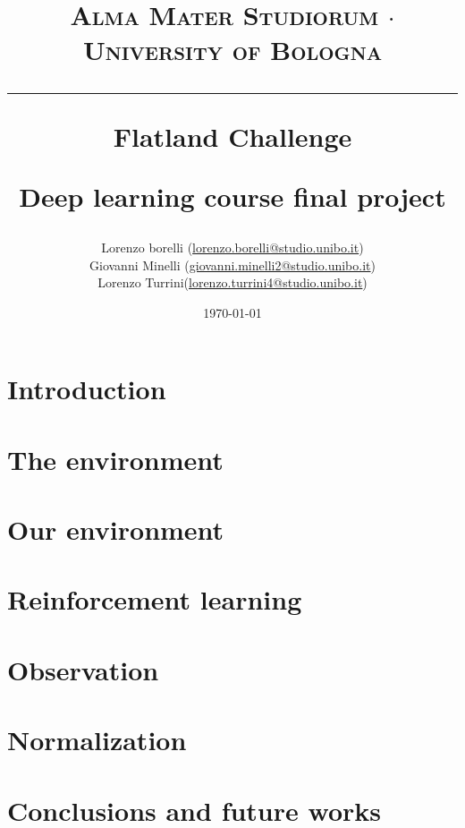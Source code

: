 \documentclass[a4paper,14pt]{extreport}
\begin{document}
\title{
	{{\large{\textsc{Alma Mater Studiorum $\cdot$ University of Bologna}}}}
	\rule{\textwidth}{0.4pt}\vspace{3mm}
	\textbf{Flatland Challenge}
	
	Deep learning course final project
}

\author{Lorenzo borelli (\href{mailto:lorenzo.borelli@studio.unibo.it}{lorenzo.borelli@studio.unibo.it}) 
\\ Giovanni Minelli (\href{mailto:giovanni.minelli2@studio.unibo.it}{giovanni.minelli2@studio.unibo.it}) 
\\ Lorenzo Turrini(\href{mailto:lorenzo.turrini4@studio.unibo.it}{lorenzo.turrini4@studio.unibo.it})}
\date{\today}
\maketitle
\newpage
\tableofcontents
\listoffigures
\listoftables
\newpage

\chapter{Introduction}


\chapter{The environment}


\chapter{Our environment}


\chapter{Reinforcement learning}


\chapter{Observation}


\chapter{Normalization}
\label{chap:normalization}


\chapter{Conclusions and future works}

\end{document}
